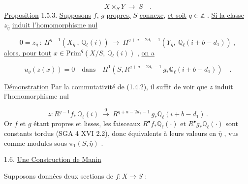 \begin{equation}\tag{1.5.2}
X \times_S Y \ \longrightarrow \ S \quad .
\end{equation}
\underline{Proposition} 1.5.3. \underline{Supposons} $f$, $g$ \underline{propres,} $S$ \underline{connexe}, \underline{et soit} $q \in \mathbb{Z}$ . \underline{Si la classe} $z_{\bar{\eta}}$ \underline{induit l'homomorphisme nul}

\begin{equation}\tag{1.5.3}
0 = z_{\bar{\eta}} \ : \ H^{q-1}(X_{\bar{\eta}} \ , \ \mathbb{Q}_\ell(i)) \ \longrightarrow \ H^{q+a-2d_1-1}(Y_{\bar{\eta}}, \ \mathbb{Q}_\ell(i+b-d_1)) \ ,
\end{equation}
\underline{alors, pour tout} $x \in \mathrm{Prim}^{q}(X/S,\ \mathbb{Q}_\ell(i))$ , \underline{on a}

\begin{equation}\tag{1.5.4}
u_g(z(x)) = 0 \quad \mathrm{dans} \quad H^{1}(S, R^{q+a-2d_1-1}\,g_*\mathbb{Q}_\ell(i+b-d_1)) \quad .
\end{equation}


\underline{Démonstration} Par la commutativité de (1.4.2), il suffit de voir que $z$ induit l'homomorphisme nul

\begin{equation}\tag{1.5.5}
z : R^{q-1}f_*\,\mathbb{Q}_\ell(i) \ \stackrel{0}{\longrightarrow} \ R^{q+a-2d_1-1}\,g_*\mathbb{Q}_\ell(i+b-d_1)\,.
\end{equation}
Or $f$ et $g$ étant propres et lisses, les faisceaux $R^{\bullet}f_*\mathbb{Q}_\ell(\cdot)$ et $R^{\bullet}g_*\mathbb{Q}_\ell(\cdot)$ sont constants tordus (SGA 4 XVI 2.2), donc équivalents à leurs valeurs en $\bar{\eta}$ , vus comme modules sous $\pi_1(S, \bar{\eta})$ .

1.6. \underline{Une Construction de Manin}

Supposons données deux sections de $f : X \longrightarrow S$ :

